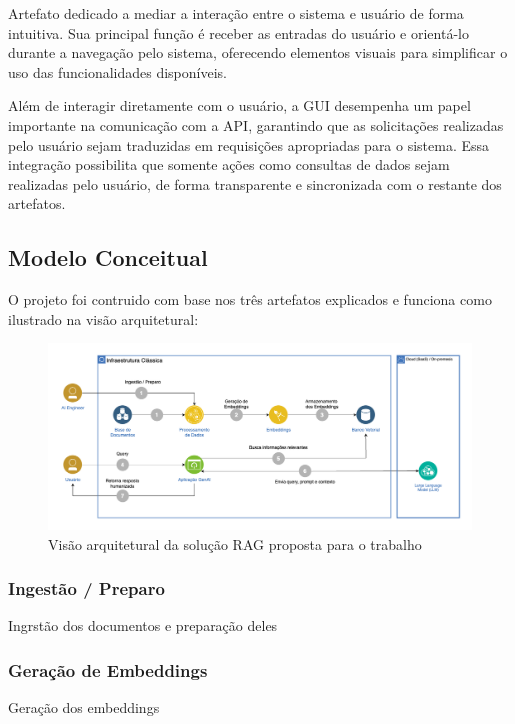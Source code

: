\documentclass[a4paper, 12pt]{article}
\begin{document}
    Artefato dedicado a mediar a interação entre o sistema e usuário de forma intuitiva. Sua principal função é receber as entradas do usuário e orientá-lo durante a navegação pelo sistema, oferecendo elementos visuais para simplificar o uso das funcionalidades disponíveis.

    Além de interagir diretamente com o usuário, a GUI desempenha um papel importante na comunicação com a API, garantindo que as solicitações realizadas pelo usuário sejam traduzidas em requisições apropriadas para o sistema. Essa integração possibilita que somente ações como consultas de dados sejam realizadas pelo usuário, de forma transparente e sincronizada com o restante dos artefatos.
    
    \subsection{Modelo Conceitual}
    
    O projeto foi contruido com base nos três artefatos explicados e funciona como ilustrado na visão arquitetural:

    \begin{figure}[h]
        \includegraphics[scale=0.3]{architecture.png}
        \centering
        \caption{Visão arquitetural da solução RAG proposta para o trabalho}
        \centering
    \end{figure}

    \subsubsection{Ingestão / Preparo}
    Ingrstão dos documentos e preparação deles

    \subsubsection{Geração de Embeddings}
    Geração dos embeddings
\end{document}
